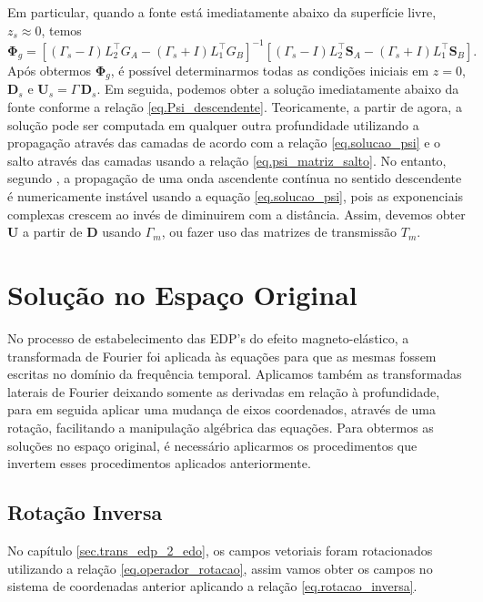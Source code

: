 Em particular, quando a fonte est\'a imediatamente abaixo da superf\'icie livre, $z_s\approx0$, temos
\begin{equation*}
\mathbf{\Phi}_g=\left[(\Gamma_s-I)L_2^{\top}G_A-(\Gamma_s+I)L_1^\top G_B\right]^{-1}\left[(\Gamma_s-I)L_2^\top\mathbf{S}_A-(\Gamma_s+I)L_1^\top\mathbf{S}_B\right].
\end{equation*} 
Ap\'os obtermos $\mathbf{\Phi}_g$, \'e poss\'ivel determinarmos todas as condi\c{c}\~oes iniciais em $z=0$, $\mathbf{D}_s$ e $\mathbf{U}_s=\Gamma\,\mathbf{D}_s$. Em seguida, podemos obter a solu\c{c}\~ao imediatamente abaixo da fonte conforme a rela\c{c}\~ao \ref{eq.Psi_descendente}. Teoricamente, a partir de agora, a solu\c{c}\~ao pode ser computada em qualquer outra profundidade utilizando a propaga\c{c}\~ao atrav\'es das camadas de acordo com a rela\c{c}\~ao \ref{eq.solucao_psi} e o salto atrav\'es das camadas usando a rela\c{c}\~ao \ref{eq.psi_matriz_salto}. No entanto, segundo \cite{White_Zhou_2006}, a propaga\c{c}\~ao de uma onda ascendente cont\'inua no sentido descendente \'e numericamente inst\'avel usando a equa\c{c}\~ao \ref{eq.solucao_psi}, pois as exponenciais complexas crescem ao inv\'es de diminuirem com a dist\^ancia. Assim, devemos obter $\mathbf{U}$ a partir de $\mathbf{D}$ usando $\Gamma_m$, ou fazer uso das matrizes de transmiss\~ao $T_m$.

\section{Solu\c{c}\~ao no Espa\c{c}o Original}

No processo de estabelecimento das EDP's do efeito magneto-el\'astico, a transformada de Fourier foi aplicada \`as equa\c{c}\~oes para que as mesmas fossem escritas no dom\'inio da frequ\^encia temporal. Aplicamos tamb\'em as transformadas laterais de Fourier deixando somente as derivadas em rela\c{c}\~ao \`a profundidade, para em seguida aplicar uma mudan\c{c}a de eixos coordenados, atrav\'es de uma rota\c{c}\~ao, facilitando a manipula\c{c}\~ao alg\'ebrica das equa\c{c}\~oes. Para obtermos as solu\c{c}\~oes no espa\c{c}o original, \'e necess\'ario aplicarmos os procedimentos que invertem esses procedimentos aplicados anteriormente.

\subsection{Rota\c{c}\~ao Inversa}
No cap\'itulo \ref{sec.trans_edp_2_edo}, os campos vetoriais foram rotacionados utilizando a rela\c{c}\~ao \ref{eq.operador_rotacao}, assim vamos obter os campos no sistema de coordenadas anterior aplicando a rela\c{c}\~ao \ref{eq.rotacao_inversa}. 


